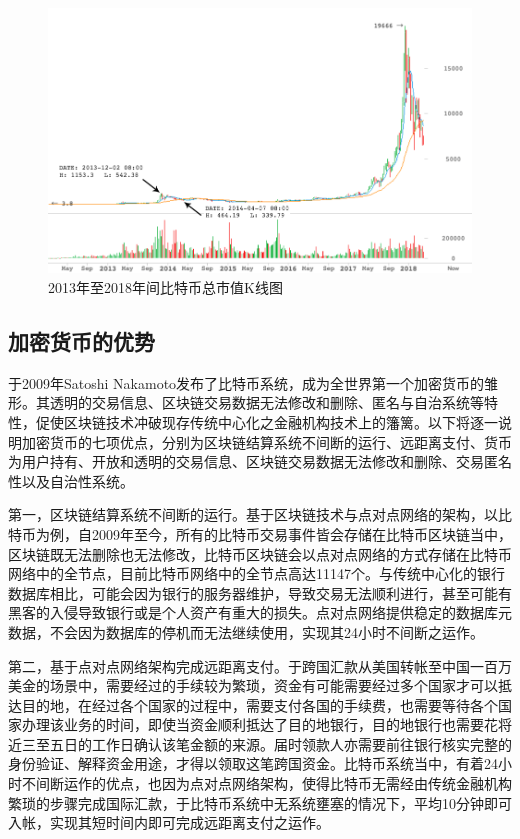 			\begin{figure}[!htb]
				\centering
				\includegraphics[width = 1\textwidth]{Thetotalmarketcapitalization.png}
				\caption{2013年至2018年间比特币总市值K线图\supercite{CryptocurrencyMarketCapitalizations}}\label{Thetotalmarketcapitalization}
			\end{figure}
		

			\subsection{加密货币的优势}
			于2009年Satoshi Nakamoto发布了比特币系统，成为全世界第一个加密货币的雏形。其透明的交易信息、区块链交易数据无法修改和删除、匿名与⾃治系统等特性，促使区块链技术冲破现存传统中⼼化之⾦融机构技术上的籓篱。以下将逐一说明加密货币的七项优点，分别为区块链结算系统不间断的运行、远距离支付、货币为用户持有、开放和透明的交易信息、区块链交易数据无法修改和删除、交易匿名性以及自治性系统。

				第一，区块链结算系统不间断的运行。基于区块链技术与点对点网络的架构，以比特币为例，自2009年至今，所有的比特币交易事件皆会存储在比特币区块链当中，区块链既无法删除也无法修改，比特币区块链会以点对点网络的方式存储在比特币网络中的全节点\supercite{YouReallyShouldRunaBitcoinFullNode:HeresWhy}，目前比特币网络中的全节点高达11147个。与传统中心化的银行数据库相比，可能会因为银行的服务器维护，导致交易无法顺利进行，甚至可能有黑客的入侵导致银行或是个人资产有重大的损失。点对点网络提供稳定的数据库元数据，不会因为数据库的停机而无法继续使用，实现其24小时不间断之运作。
				
				第二，基于点对点网络架构完成远距离支付。于跨国汇款从美国转帐至中国一百万美金的场景中，需要经过的手续较为繁琐，资金有可能需要经过多个国家才可以抵达目的地，在经过各个国家的过程中，需要支付各国的手续费，也需要等待各个国家办理该业务的时间，即使当资金顺利抵达了目的地银行，目的地银行也需要花将近三至五日的工作日确认该笔金额的来源。届时领款人亦需要前往银行核实完整的身份验证、解释资金用途，才得以领取这笔跨国资金。比特币系统当中，有着24小时不间断运作的优点，也因为点对点网络架构，使得比特币无需经由传统金融机构繁琐的步骤完成国际汇款，于比特币系统中无系统壅塞的情况下，平均10分钟即可入帐，实现其短时间内即可完成远距离支付之运作。

